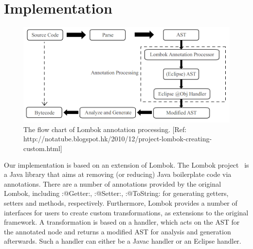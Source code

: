 \section{Implementation}

\begin{figure}[t]\label{fig:lombok}
\centering
\includegraphics[width=5in]{pdfs/lombok.png}
\caption{The flow chart of Lombok annotation processing. [Ref: http://notatube.blogspot.hk/2010/12/project-lombok-creating-custom.html]}
\end{figure}

Our implementation is based on an extension of Lombok. The Lombok
project~\cite{lombok} is a Java library that aims at removing (or
reducing) Java boilerplate code via
annotations. There are a number of annotations provided by the
original Lombok, including \Q:@Getter:, \Q:@Setter:,
\Q:@ToString: for generating getters, setters and 
methods, respectively.  Furthermore, Lombok provides a number of
interfaces for users to create custom transformations, as extensions
to the original framework.
A transformation is based on a handler, which acts on the AST for the
annotated node and returns a modified AST for analysis and
generation afterwards. Such a handler can either be a Javac handler or
an Eclipse handler.

